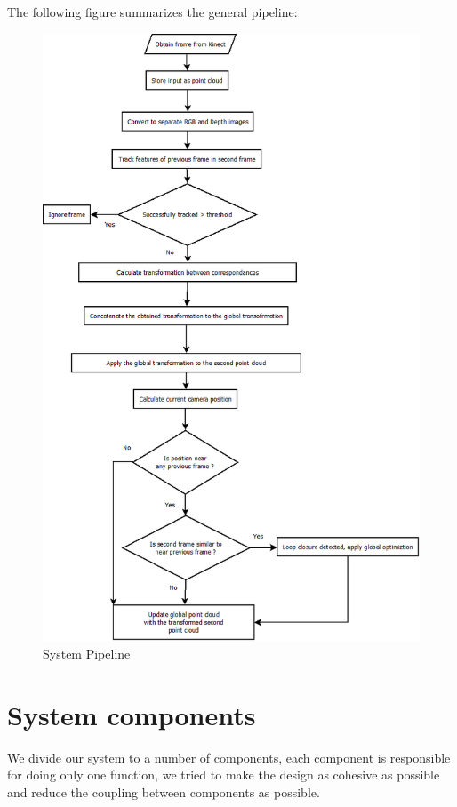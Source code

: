 The following figure summarizes the general pipeline:
\begin{figure}[H]
\centering
\includegraphics[scale=0.45,keepaspectratio=true]{System_Analysis_and_Design/pipeline.png}
\caption{System Pipeline}
\label{fig:system_pipeline}
\end{figure}

\section{System components}

We divide our system to a number of components, each component is responsible for doing only one function, we tried to make the design as cohesive as possible and reduce the coupling between components as possible.

